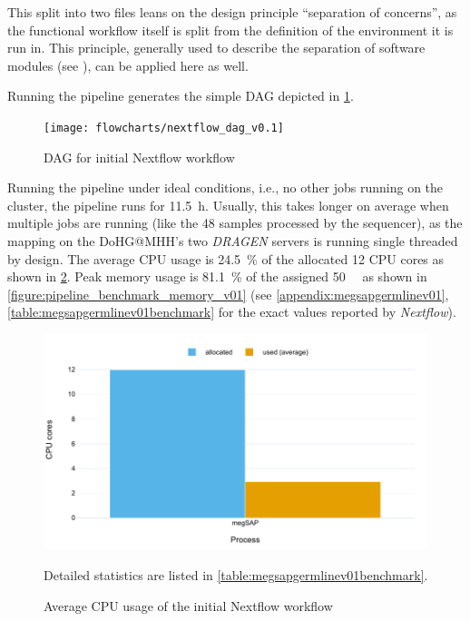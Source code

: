 This split into two files leans on the design principle \enquote{separation of concerns}, as the functional workflow itself is split from the definition of the environment it is run in. This principle, generally used to describe the separation of software modules (see \autocite{Parnas1972}), can be applied here as well.

Running the pipeline generates the simple \ac{DAG} depicted in \cref{fig:dag_v01}.

\begin{figure}[H]
    \centering
	\texttt{[image: flowcharts/nextflow\_dag\_v0.1]}
	\caption{\Ac{DAG} for initial Nextflow workflow}
	\label{fig:dag_v01}
\end{figure}

Running the pipeline under ideal conditions, i.e., no other jobs running on the cluster, the pipeline runs for \SI{11.5}{\hour}. Usually, this takes longer on average when multiple jobs are running (like the 48 samples processed by the sequencer), as the mapping on the \ac{DoHG@MHH}'s two \textit{DRAGEN} servers is running single threaded by design. The average CPU usage is \SI{24.5}{\percent} of the allocated \num{12} CPU cores as shown in \cref{figure:pipeline_benchmark_CPU_v01}. Peak memory usage is \SI{81.1}{\percent} of the assigned \SI{50}{\giga\byte} as shown in  \cref{figure:pipeline_benchmark_memory_v01} (see \cref{appendix:megsapgermlinev01}, \cref{table:megsapgermlinev01benchmark} for the exact values reported by \textit{Nextflow}).

\begin{figure}[H]
    \centering
	\includegraphics[width=\linewidth,height=\textheight,keepaspectratio]{pipeline_benchmark_CPU_v01}
	\caption{Average CPU usage of the initial Nextflow workflow}{Detailed statistics are listed in \cref{table:megsapgermlinev01benchmark}.}
	\label{figure:pipeline_benchmark_CPU_v01}
\end{figure}

